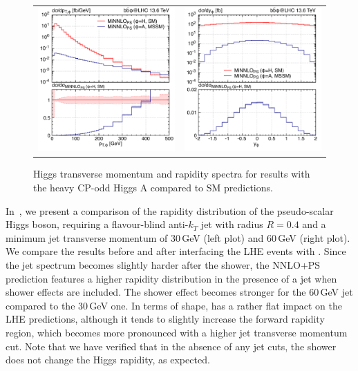\documentclass[11pt,a4paper]{article}
\begin{document}
\begin{figure}[t!]
\begin{center}
\begin{tabular}{cc}
\includegraphics[width=.45\textwidth, page=1]{plots/5fs/BSM/pt_Higgs.pdf}&
\includegraphics[width=.45\textwidth, page=1]{plots/5fs/BSM/y_Higgs.pdf}
\end{tabular}
\vspace*{1ex}
\caption{Higgs transverse momentum and rapidity spectra for \minnlo{} results with the heavy CP-odd Higgs $\text{A}$ compared to SM predictions.\label{fig:SMvsBSM}}
\end{center}
\end{figure}

In~, we present a comparison of the rapidity distribution of the pseudo-scalar Higgs boson, requiring a flavour-blind anti-$k_T$ jet with radius $R = 0.4$ and 
a minimum jet transverse momentum of 30\,GeV (left plot) and 60\,GeV (right plot). We compare the results before and after interfacing the LHE events with . 
Since the jet spectrum becomes slightly harder after the shower, the NNLO+PS prediction features a higher rapidity distribution in the 
presence of a jet when shower effects are included. The shower effect becomes stronger for the 60\,GeV jet compared to the 30\,GeV one. 
In terms of shape,  has a rather flat impact on the LHE predictions, although it tends to slightly increase the forward rapidity region, which becomes 
more pronounced with a higher jet transverse momentum cut. Note that we have verified that in the absence of any jet cuts, the shower does not change the 
Higgs rapidity, as expected.  
\end{document}
